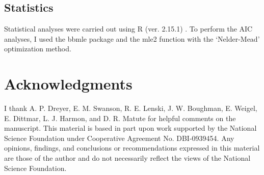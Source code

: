 \begin{doublespace}
\subsection{Statistics}

Statistical analyses were carried out using R (ver. 2.15.1) \citep{r13}.
%
To perform the AIC analyses, I used the bbmle package \citep{bol08}
and the mle2 function with the `Nelder-Mead' optimization method.
%




\section{Acknowledgments}

I thank A. P. Dreyer, E. M. Swanson, R. E. Lenski, J. W. Boughman,
E. Weigel, E. Dittmar, L. J. Harmon, and D. R. Matute
for helpful comments on the manuscript.
%
This material is based in part upon work supported
by the National Science Foundation under Cooperative Agreement No. DBI-0939454.
Any opinions, findings, and conclusions or recommendations
expressed in this material are those of the author
and do not necessarily reflect the views of the National Science Foundation.



\end{doublespace}



